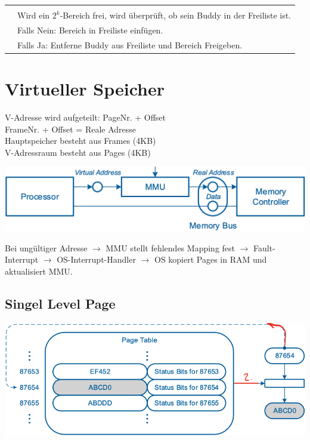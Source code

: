 \documentclass[8pt,landscape,a4paper]{scrartcl}
\begin{document}
\begin{multicols*}{5}
\begin{center}
\begin{tabular}{p{.1mm}|p{4.8cm}}
\begin{center}
			\vspace{-8pt}
		\end{center}\\
		&Wird ein $2^k$-\textcolor{b}{Bereich frei}, wird \textcolor{b}{überprüft}, ob sein \textcolor{b}{Buddy in der Freiliste} ist.\\
		&Falls Nein: Bereich in Freiliste einfügen.\\
		&Falls Ja: Entferne Buddy aus Freiliste und Bereich Freigeben.\\
	\end{tabular}
\end{center}






\section{Virtueller Speicher}
V-Adresse wird aufgeteilt: PageNr. + Offset\\
FrameNr. + Offset = Reale Adresse\\
Hauptspeicher besteht aus Frames (4KB)\\
V-Adressraum besteht aus Pages (4KB)\vspace{-4pt}
\begin{center}
	\includegraphics[scale=.17]{Graphic/VAddr}\vspace{-4pt}
\end{center}
Bei ungültiger Adresse $\rightarrow$ MMU stellt fehlendes Mapping fest $\rightarrow$ Fault-Interrupt $\rightarrow$ OS-Interrupt-Handler $\rightarrow$ OS kopiert Pages in RAM und aktualisiert MMU. 
\subsection{Singel Level Page}
\begin{center}
	\includegraphics[scale=.25]{Graphic/SingleLevelPage}
\end{center}\vspace{-10pt}

\end{multicols*}
\end{document}
